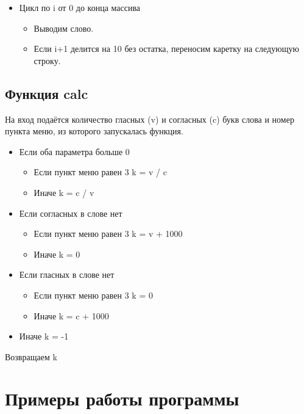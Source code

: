 \documentclass[12pt,a4paper]{article}  %
\begin{document}
\begin{itemize}
	\item Цикл по i от 0 до конца массива
	\begin{itemize}
		\item Выводим слово.
		\item Если i+1 делится на 10 без остатка, переносим каретку на следующую строку.
	\end{itemize}
\end{itemize}

\subsection*{Функция calc}

На вход подаётся количество гласных (v) и согласных (c) букв слова и номер пункта меню, из которого запускалась функция.

\begin{itemize}
	\item Если оба параметра больше 0
	\begin{itemize}
		\item Если пункт меню равен 3 
		\subitem k = v / c
		\item Иначе
		\subitem k = c / v
	\end{itemize}
	\item Если согласных в слове нет
	\begin{itemize}
		\item Если пункт меню равен 3 
		\subitem k = v + 1000
		\item Иначе
		\subitem k = 0
	\end{itemize}
	\item Если гласных в слове нет
	\begin{itemize}
		\item Если пункт меню равен 3 
		\subitem k = 0
		\item Иначе
		\subitem k = c + 1000
	\end{itemize}
	\item Иначе k = -1
\end{itemize}

Возвращаем k
\newpage
\section{Примеры работы программы}
\setcounter{figure}{0}

\end{document}
